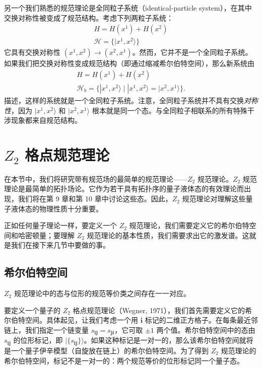 另一个我们熟悉的规范理论是全同粒子系统（identical-particle system），在其中交换对称性被变成了规范结构。考虑下列两粒子系统：
\begin{gather*}
H = H(x^1) + H(x^2)\\
\mathcal{H} = \{|x^1, x^2\rangle\}
\end{gather*}
它具有交换对称性 $(x^1, x^2) \to (x^2, x^1)$。然而，它并不是一个全同粒子系统。如果我们把交换对称性变成规范结构（即通过缩减希尔伯特空间），那么新系统由
\begin{gather*}
H = H(x^1) + H(x^2)\\
\mathcal{H}_b = \{|x^1, x^2\rangle \mid |x^1, x^2\rangle = |x^2, x^1\rangle\}.
\end{gather*}
描述，这样的系统就是一个全同粒子系统。注意，全同粒子系统并不具有交换\emph{对称性}，因为 $|x^1, x^2\rangle$ 和 $|x^2, x^1\rangle$ 根本就是同一个态。与全同粒子相联系的所有特殊干涉现象都来自规范结构。

\section{$Z_2$ 格点规范理论}

在本节中，我们将研究带有规范场的最简单的规范理论——$Z_2$ 规范理论。$Z_2$ 规范理论是最简单的拓扑场论。它作为若干具有拓扑序的量子液体态的有效理论而出现，我们将在第 9 章和第 10 章中讨论这些态。因此，$Z_2$ 规范理论对理解这些量子液体态的物理性质十分重要。


正如任何量子理论一样，要定义一个 $Z_2$ 规范理论，我们需要定义它的希尔伯特空间和哈密顿量；要理解 $Z_2$ 规范理论的基本性质，我们需要求出它的激发谱。这就是我们在接下来几节中要做的事。

\subsection{希尔伯特空间}

\begin{keypoints}
\item $Z_2$ 规范理论中的态与位形的规范等价类之间存在一一对应。
\end{keypoints}

要定义一个量子的 $Z_2$ 格点规范理论（Wegner, 1971），我们首先需要定义它的希尔伯特空间。具体起见，让我们考虑一个用 $\pmb{i}$ 标记的二维正方格子。在每条最近邻链上，我们指定一个链变量 $s_{\pmb{ij}} = s_{\pmb{ji}}$，它可取 $\pm 1$ 两个值。希尔伯特空间中的态由 $s_{\pmb{ij}}$ 的位形标记，即 $|\{s_{\pmb{ij}}\}\rangle$。如果这种标记是一对一的，那么该希尔伯特空间就将是一个量子伊辛模型（自旋放在链上）的希尔伯特空间。为了得到 $Z_2$ 规范理论的希尔伯特空间，标记不是一对一的：两个规范等价的位形标记同一个量子态。

